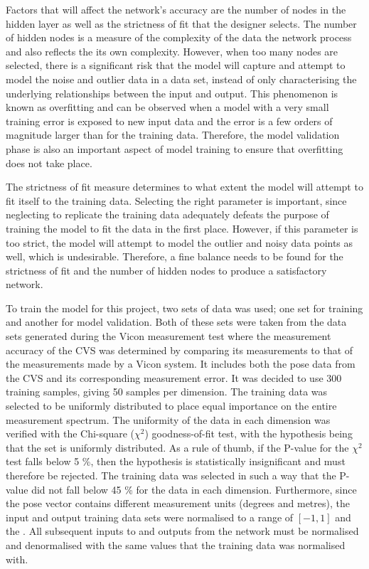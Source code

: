 Factors that will affect the network's accuracy are the number of nodes in the hidden layer as well as the strictness of fit that the designer selects. The number of hidden nodes is a measure of the complexity of the data the network process and also reflects the its own complexity. However, when too many nodes are selected, there is a significant risk that the model will capture and attempt to model the noise and outlier data in a data set, instead of only characterising the underlying relationships between the input and output. This phenomenon is known as overfitting and can be observed when a model with a very small training error is exposed to new input data and the error is a few orders of magnitude larger than for the training data. Therefore, the model validation phase is also an important aspect of model training to ensure that overfitting does not take place. 

The strictness of fit measure determines to what extent the model will attempt to fit itself to the training data. Selecting the right parameter is important, since neglecting to replicate the training data adequately defeats the purpose of training the model to fit the data in the first place. However, if this parameter is too strict, the model will attempt to model the outlier and noisy data points as well, which is undesirable. Therefore, a fine balance needs to be found for the strictness of fit and the number of hidden nodes to produce a satisfactory network.  

To train the model for this project, two sets of data was used; one set for training and another for model validation. Both of these sets were taken from the data sets generated during the Vicon measurement test where the measurement accuracy of the CVS was determined by comparing its measurements to that of the measurements made by a Vicon system. It includes both the pose data from the CVS and its corresponding measurement error. It was decided to use 300 training samples, giving 50 samples per dimension. The training data was selected to be uniformly distributed to place equal importance on the entire measurement spectrum. The uniformity of the data in each dimension was verified with the Chi-square ($\chi^2$) goodness-of-fit test, with the hypothesis being that the set is uniformly distributed. As a rule of thumb, if the P-value for the $\chi^2$ test falls below 5 \%, then the hypothesis is statistically insignificant and must therefore be rejected. The training data was selected in such a way that the P-value did not fall below 45 \% for the data in each dimension. Furthermore, since the pose vector contains different measurement units (degrees and metres), the input and output training data sets were normalised to a range of $[-1, 1]$ and the . All subsequent inputs to and outputs from the network must be normalised and denormalised with the same values that the training data was normalised with.  

